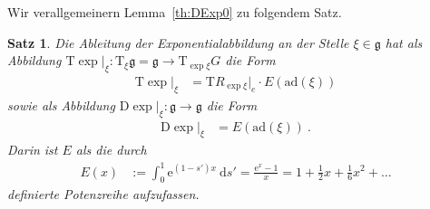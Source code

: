 \documentclass[10pt,a4paper]{article}
\theoremstyle{mytheorem}
\newtheorem{theorem}{Satz}[section]
\theoremstyle{mydefinition}
\newcommand{\dt}{\mathrm{d}}
\newcommand{\Dt}{\mathrm{D}}
\newcommand{\Tt}{\mathrm{T}}
\newcommand{\ad}{\mathrm{ad}}
\newcommand{\fg}{\mathfrak{g}}
\begin{document}
Wir verallgemeinern Lemma~\ref{th:DExp0} zu folgendem Satz.
\begin{theorem}
\label{th:DExp}
Die Ableitung der Exponentialabbildung an der Stelle $\xi\in\fg$ hat als Abbildung $\Tt\exp|_{\xi}:\Tt_\xi\fg=\fg\rightarrow\Tt_{\exp\xi}G$ die Form
\begin{align*}
	\Tt\exp|_{\xi}
	&= \Tt R_{\exp\xi}|_e\cdot E(\ad(\xi))
\end{align*}
sowie als Abbildung $\Dt\exp|_{\xi}:\fg\rightarrow\fg$ die Form
\begin{align*}
	\Dt\exp|_{\xi}
	&= E(\ad(\xi))
	\ .
\end{align*}
Darin ist $E$ als die durch
\begin{align*}
	E(x) &:=
	\int_0^1
	\mathrm{e}^{(1-s')x}\ \dt s'
	= \frac{\mathrm{e}^x-1}{x}
	= 1 + \frac{1}{2}x + \frac{1}{6}x^2 + \ldots
\end{align*}
definierte Potenzreihe aufzufassen.
\end{theorem}
\end{document}
